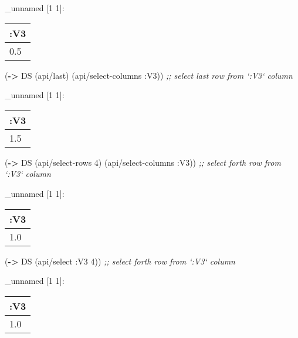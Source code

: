 \documentclass[]{article}
\newenvironment{Shaded}{\begin{snugshade}}{\end{snugshade}}
\newcommand{\AttributeTok}[1]{\textcolor[rgb]{0.77,0.63,0.00}{#1}}
\newcommand{\CommentTok}[1]{\textcolor[rgb]{0.56,0.35,0.01}{\textit{#1}}}
\newcommand{\DecValTok}[1]{\textcolor[rgb]{0.00,0.00,0.81}{#1}}
\newcommand{\KeywordTok}[1]{\textcolor[rgb]{0.13,0.29,0.53}{\textbf{#1}}}
\newcommand{\NormalTok}[1]{#1}
\begin{document}
\_unnamed {[}1 1{]}:

\begin{longtable}[]{@{}l@{}}
\toprule
:V3\tabularnewline
\midrule
\endhead
0.5\tabularnewline
\bottomrule
\end{longtable}

\begin{Shaded}
\begin{Highlighting}[]
\NormalTok{(}\KeywordTok{->}\NormalTok{ DS}
\NormalTok{    (api/last)}
\NormalTok{    (api/select-columns }\AttributeTok{:V3}\NormalTok{)) }\CommentTok{;; select last row from `:V3` column}
\end{Highlighting}
\end{Shaded}

\_unnamed {[}1 1{]}:

\begin{longtable}[]{@{}l@{}}
\toprule
:V3\tabularnewline
\midrule
\endhead
1.5\tabularnewline
\bottomrule
\end{longtable}

\begin{Shaded}
\begin{Highlighting}[]
\NormalTok{(}\KeywordTok{->}\NormalTok{ DS}
\NormalTok{    (api/select-rows }\DecValTok{4}\NormalTok{)}
\NormalTok{    (api/select-columns }\AttributeTok{:V3}\NormalTok{)) }\CommentTok{;; select forth row from `:V3` column}
\end{Highlighting}
\end{Shaded}

\_unnamed {[}1 1{]}:

\begin{longtable}[]{@{}l@{}}
\toprule
:V3\tabularnewline
\midrule
\endhead
1.0\tabularnewline
\bottomrule
\end{longtable}

\begin{Shaded}
\begin{Highlighting}[]
\NormalTok{(}\KeywordTok{->}\NormalTok{ DS}
\NormalTok{    (api/select }\AttributeTok{:V3} \DecValTok{4}\NormalTok{)) }\CommentTok{;; select forth row from `:V3` column}
\end{Highlighting}
\end{Shaded}

\_unnamed {[}1 1{]}:

\begin{longtable}[]{@{}l@{}}
\toprule
:V3\tabularnewline
\midrule
\endhead
1.0\tabularnewline
\bottomrule
\end{longtable}
\end{document}
